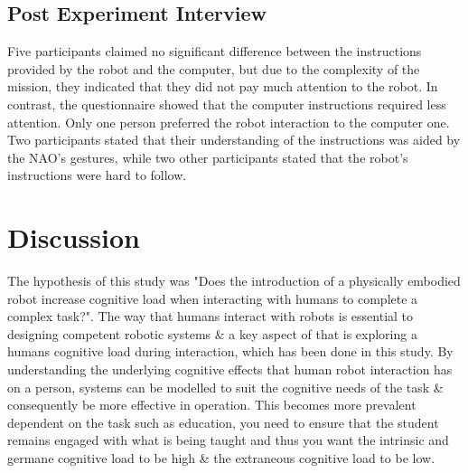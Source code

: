 \documentclass[conference]{IEEEtran}
\begin{document}
\subsection{Post Experiment Interview}
Five participants claimed no significant difference between the instructions provided by the robot and the computer, but due to the complexity of the mission, they indicated that they did not pay much attention to the robot. In contrast, the questionnaire showed that the computer instructions required less attention. Only one person preferred the robot interaction to the computer one. Two participants stated that their understanding of the instructions was aided by the NAO’s gestures, while two other participants stated that the robot's instructions were hard to follow. 

\section{Discussion}

 The hypothesis of this study was "Does the introduction of a physically embodied robot increase cognitive load when interacting with humans to complete a complex task?". The way that humans interact with robots is essential to designing competent robotic systems \& a key aspect of that is exploring a humans cognitive load during interaction, which has been done in this study. By understanding the underlying cognitive effects that human robot interaction has on a person, systems can be modelled to suit the cognitive needs of the task \& consequently be more effective in operation. This becomes more prevalent dependent on the task such as education, you need to ensure that the student remains engaged with what is being taught and thus you want the intrinsic and germane cognitive load to be high \& the extraneous cognitive load to be low.\newline
 
\end{document}
